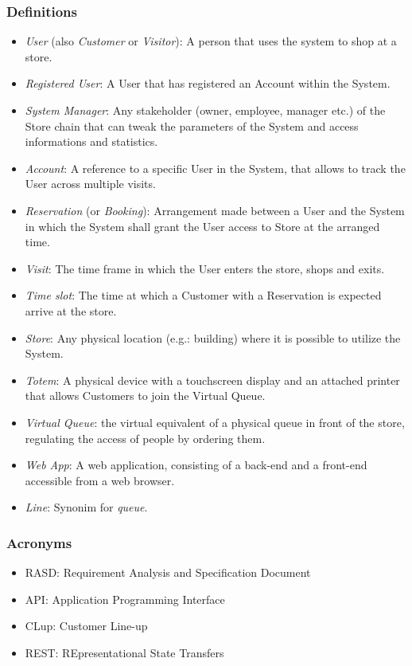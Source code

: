 \subsubsection{Definitions}
\begin{itemize}
    \item \emph{User} (also \emph{Customer} or \emph{Visitor}): A person that uses the system to shop at a store.
    \item \emph{Registered User}: A User that has registered an Account within the System.
    \item \emph{System Manager}: Any stakeholder (owner, employee, manager etc.) of the Store chain that can tweak the parameters of the System and access informations and statistics.
    \item \emph{Account}: A reference to a specific User in the System, that allows to track the User across multiple visits.
    \item \emph{Reservation} (or \emph{Booking}): Arrangement made between a User and the System in which the System shall grant the User access to Store at the arranged time.
    \item \emph{Visit}: The time frame in which the User enters the store, shops and exits.
    \item \emph{Time slot}: The time at which a Customer with a Reservation is expected arrive at the store.
    \item \emph{Store}: Any physical location (e.g.: building) where it is possible to utilize the System.
    \item \emph{Totem}: A physical device with a touchscreen display and an attached printer that allows Customers to join the Virtual Queue.
    \item \emph{Virtual Queue}: the virtual equivalent of a physical queue in front of the store, regulating the access of people by ordering them.
    \item \emph{Web App}: A web application, consisting of a back-end and a front-end accessible from a web browser.
    \item \emph{Line}: Synonim for \emph{queue}.
\end{itemize}

\subsubsection{Acronyms}
\begin{itemize}
    \item RASD: Requirement Analysis and Specification Document
    \item API: Application Programming Interface
    \item CLup: Customer Line-up
    \item REST: REpresentational State Transfers
\end{itemize}


